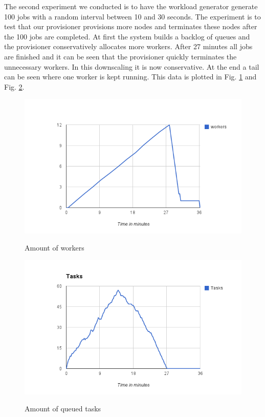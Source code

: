 \documentclass[a4paper]{IEEEtran}
\begin{document}
The second experiment we conducted is to have the workload generator generate 100 jobs with a random interval between 10 and 30 seconds.
The experiment is to test that our provisioner provisions more nodes and terminates these nodes after the 100 jobs are completed.
At first the system builds a backlog of queues and the provisioner conservatively allocates more workers.
After 27 minutes all jobs are finished and it can be seen that the provisioner quickly terminates the unnecessary workers.
In this downscaling it is now conservative.
At the end a tail can be seen where one worker is kept running.
This data is plotted in Fig. \ref{fig:100-workers} and Fig. \ref{fig:100-tasks}.

\begin{figure}[ht]
	\includegraphics[scale=0.5]{fig/100workers.png}
	\label{fig:100-workers}
	\caption{Amount of workers}
\end{figure}

\begin{figure}[ht]
	\includegraphics[scale=0.5]{fig/100tasks.png}
	\label{fig:100-tasks}
	\caption{Amount of queued tasks}
\end{figure}
\end{document}
